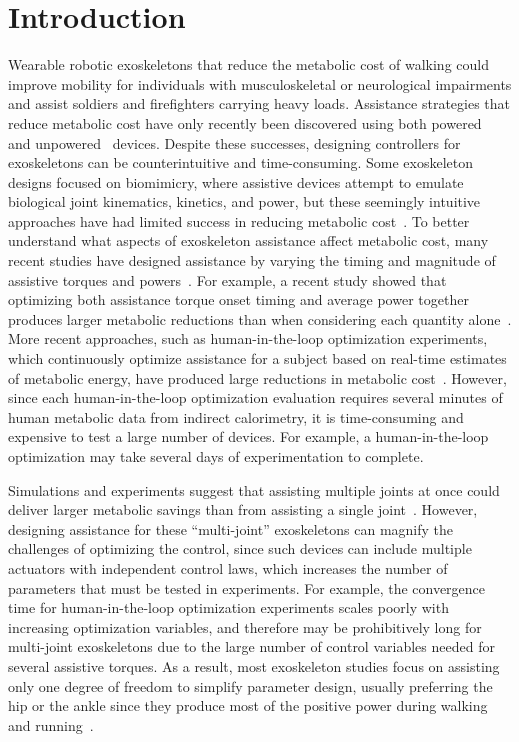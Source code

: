 \documentclass[10pt,letterpaper]{article}
\begin{document}
\section*{Introduction}
Wearable robotic exoskeletons that reduce the metabolic cost of walking could improve mobility for individuals with musculoskeletal or neurological impairments and assist soldiers and firefighters carrying heavy loads. Assistance strategies that reduce metabolic cost have only recently been discovered using both powered~\cite{Sawicki:2008, Malcolm:2013, Mooney:2014, Sawicki:2020} and unpowered~\cite{Collins:2015} devices. Despite these successes, designing controllers for exoskeletons can be counterintuitive and time-consuming. Some exoskeleton designs focused on biomimicry, where assistive devices attempt to emulate biological joint kinematics, kinetics, and power, but these seemingly intuitive approaches have had limited success in reducing metabolic cost~\cite{vanDijk:2011, Cornwall:2015}. To better understand what aspects of exoskeleton assistance affect metabolic cost, many recent studies have designed assistance by varying the timing and magnitude of assistive torques and powers~\cite{Zhang:2017, Ding:2016, Ding:2018, Galle:2017, Quinlivan:2017}. For example, a recent study showed that optimizing both assistance torque onset timing and average power together produces larger metabolic reductions than when considering each quantity alone~\cite{Galle:2017}. More recent approaches, such as human-in-the-loop optimization experiments, which continuously optimize assistance for a subject based on real-time estimates of metabolic energy, have produced large reductions in metabolic cost~\cite{Zhang:2017, Ding:2018}. However, since each human-in-the-loop optimization evaluation requires several minutes of human metabolic data from indirect calorimetry, it is time-consuming and expensive to test a large number of devices. For example, a human-in-the-loop optimization may take several days of experimentation to complete.

Simulations and experiments suggest that assisting multiple joints at once could deliver larger metabolic savings than from assisting a single joint~\cite{Uchida:2016, Quinlivan:2017, Malcolm:2018, Bryan:2020}. However, designing assistance for these ``multi-joint'' exoskeletons can magnify the challenges of optimizing the control, since such devices can include multiple actuators with independent control laws, which increases the number of parameters that must be tested in experiments. For example, the convergence time for human-in-the-loop optimization experiments scales poorly with increasing optimization variables, and therefore may be prohibitively long for multi-joint exoskeletons due to the large number of control variables needed for several assistive torques. As a result, most exoskeleton studies focus on assisting only one degree of freedom to simplify parameter design, usually preferring the hip or the ankle since they produce most of the positive power during walking and running~\cite{Winter:1991, Novacheck:1998, Farris:2012, Sawicki:2020}. 
\end{document}
